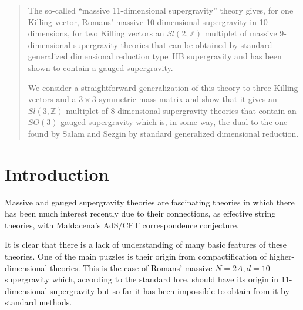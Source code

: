 \documentclass[12pt,a4paper]{article}
\begin{document}
\begin{quotation}

\small

The so-called ``massive 11-dimensional supergravity'' theory gives,
for one Killing vector, Romans' massive 10-dimensional supergravity in
10 dimensions, for two Killing vectors an $Sl(2,\mathbb{Z})$ multiplet
of massive 9-dimensional supergravity theories that can be obtained by
standard generalized dimensional reduction type~IIB supergravity
and has been shown to contain a gauged supergravity.

We consider a straightforward generalization of this theory to three
Killing vectors and a $3\times 3$ symmetric mass matrix and show that
it gives an $Sl(3,\mathbb{Z})$ multiplet of 8-dimensional supergravity
theories that contain an $SO(3)$ gauged supergravity which is, in some
way, the dual to the one found by Salam and Sezgin by standard
generalized dimensional reduction.

\end{quotation}


\newpage

\pagestyle{plain}

\section*{Introduction}


Massive and gauged supergravity theories are fascinating theories in
which there has been much interest recently due to their connections,
as effective string theories, with Maldacena's AdS/CFT correspondence
conjecture.

It is clear that there is a lack of understanding of many basic
features of these theories. One of the main puzzles is their origin
from compactification of higher-dimensional theories.  This is the
case of Romans' massive $N=2A,d=10$ supergravity \cite{kn:Ro2} which,
according to the standard lore, should have its origin in
11-dimensional supergravity but so far it has been impossible to
obtain from it by standard methods.
\end{document}
